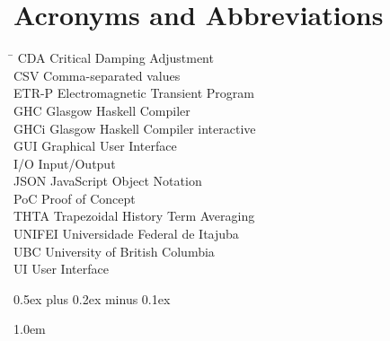 \section*{Acronyms and Abbreviations}
\begin{tabbing}
 \hspace*{1.6cm}  \= \kill
 CDA \> Critical Damping Adjustment \\[0.5ex]
 CSV \> Comma-separated values  \\[0.5ex]
 ETR-P \> Electromagnetic Transient Program \\[0.5ex]
 GHC \> Glasgow Haskell Compiler   \\[0.5ex]
 GHCi \> Glasgow Haskell Compiler interactive  \\[0.5ex]
 GUI \> Graphical User Interface  \\[0.5ex]
 I/O \> Input/Output \\[0.5ex]
 JSON \> JavaScript Object Notation \\[0.5ex]
 PoC \> Proof of Concept \\[0.5ex]
 THTA \> Trapezoidal History Term Averaging \\[0.5ex]
 UNIFEI \> Universidade Federal de Itajuba \\[0.5ex]
 UBC \> University of British Columbia \\[0.5ex]
 UI \> User Interface \\[0.5ex]

\end{tabbing}

\listoftables

\listoffigures

\lstlistoflistings

\cleardoublepage

\parskip 0.5ex plus 0.2ex minus 0.1ex

\parindent    1.0em


